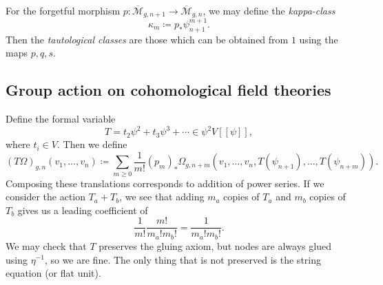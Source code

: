 \documentclass[leqno, openany]{memoir}
\theoremstyle{definition}
\theoremstyle{remark}
\theoremstyle{plain}
\theoremstyle{definition}
\theoremstyle{remark}
\newcommand{\mc}[1]{\mathcal{#1}}
\newcommand{\ol}[1]{\overline{#1}}
\begin{document}
For the forgetful morphism $p \colon \ol{\mc{M}}_{g,n+1} \to \ol{\mc{M}}_{g,n}$, we may define the \textit{kappa-class}
\[ \kappa_m \coloneqq p_* \psi_{n+1}^{m+1}. \]
Then the \textit{tautological classes} are those which can be obtained from $1$ using the maps $p,q,s$.

\subsection{Group action on cohomological field theories}
\label{subsec:group_action}

Define the formal variable
\[ T = t_2 \psi^2 + t_3 \psi^3 + \cdots \in \psi^2 V[[\psi]], \]
where $t_i \in V$. Then we define
\[ (T\Omega)_{g,n}(v_1, \ldots, v_n) \coloneqq \sum_{m\geq 0} \frac{1}{m!} (p_m)_* \Omega_{g,n+m}(v_1, \ldots, v_n, T(\psi_{n+1}), \ldots, T(\psi_{n+m})). \]
Composing these translations corresponds to addition of power series. If we consider the action $T_a+T_b$, we see that adding $m_a$ copies of $T_a$ and $m_b$ copies of $T_b$ gives us a leading coefficient of
\[ \frac{1}{m!} \frac{m!}{m_a!m_b!} = \frac{1}{m_a! m_b!}. \]
We may check that $T$ preserves the gluing axiom, but nodes are always glued using $\eta^{-1}$, so we are fine. The only thing that is not preserved is the string equation (or flat unit).
\end{document}

